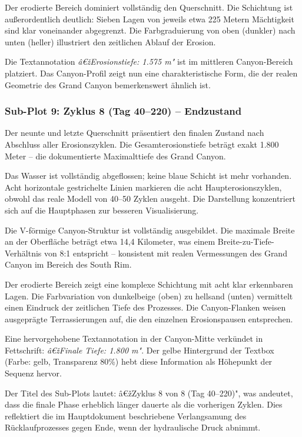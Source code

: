 Der erodierte Bereich dominiert vollständig den Querschnitt. Die Schichtung ist außerordentlich deutlich: Sieben Lagen von jeweils etwa 225 Metern Mächtigkeit sind klar voneinander abgegrenzt. Die Farbgraduierung von oben (dunkler) nach unten (heller) illustriert den zeitlichen Ablauf der Erosion.

Die Textannotation \textit{â€žErosionstiefe: 1.575 m"} ist im mittleren Canyon-Bereich platziert. Das Canyon-Profil zeigt nun eine charakteristische Form, die der realen Geometrie des Grand Canyon bemerkenswert ähnlich ist.

\subsubsection*{Sub-Plot 9: Zyklus 8 (Tag 40--220) -- Endzustand}

Der neunte und letzte Querschnitt präsentiert den finalen Zustand nach Abschluss aller Erosionszyklen. Die Gesamterosionstiefe beträgt exakt 1.800 Meter -- die dokumentierte Maximalttiefe des Grand Canyon.

Das Wasser ist vollständig abgeflossen; keine blaue Schicht ist mehr vorhanden. Acht horizontale gestrichelte Linien markieren die acht Haupterosionszyklen, obwohl das reale Modell von 40--50 Zyklen ausgeht. Die Darstellung konzentriert sich auf die Hauptphasen zur besseren Visualisierung.

Die V-förmige Canyon-Struktur ist vollständig ausgebildet. Die maximale Breite an der Oberfläche beträgt etwa 14,4 Kilometer, was einem Breite-zu-Tiefe-Verhältnis von 8:1 entspricht -- konsistent mit realen Vermessungen des Grand Canyon im Bereich des South Rim.

Der erodierte Bereich zeigt eine komplexe Schichtung mit acht klar erkennbaren Lagen. Die Farbvariation von dunkelbeige (oben) zu hellsand (unten) vermittelt einen Eindruck der zeitlichen Tiefe des Prozesses. Die Canyon-Flanken weisen ausgeprägte Terrassierungen auf, die den einzelnen Erosionspausen entsprechen.

Eine hervorgehobene Textannotation in der Canyon-Mitte verkündet in Fettschrift: \textit{â€žFinale Tiefe: 1.800 m"}. Der gelbe Hintergrund der Textbox (Farbe: gelb, Transparenz 80\%) hebt diese Information als Höhepunkt der Sequenz hervor.

Der Titel des Sub-Plots lautet: â€žZyklus 8 von 8 (Tag 40--220)", was andeutet, dass die finale Phase erheblich länger dauerte als die vorherigen Zyklen. Dies reflektiert die im Hauptdokument beschriebene Verlangsamung des Rücklaufprozesses gegen Ende, wenn der hydraulische Druck abnimmt.

